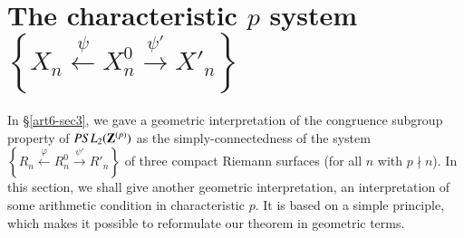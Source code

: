 \section{The characteristic $p$ system $\left\{X_n \xleftarrow{\psi} X^0_n \xrightarrow{\psi'} X'_n \right\}$}\label{art6-sec4}
In \S \ref{art6-sec3}, we gave a geometric interpretation of the congruence subgroup property of $PSL_2 (\mathbf{Z}^{(p)})$ as the simply-connectedness of the system  $\left\{R_n \xleftarrow{\varphi} R^0_n \xrightarrow{\psi'} R'_n \right\}$ of three compact Riemann surfaces (for all $n$ with $p \nmid n$). In this section, we shall give another geometric interpretation, an interpretation of some arithmetic condition in characteristic $p$. It is based on a simple principle, which makes it possible to reformulate our theorem in geometric terms.

